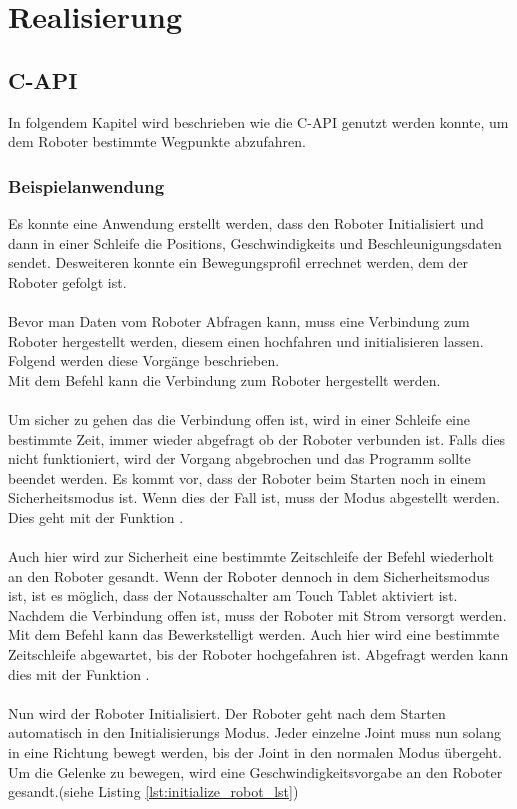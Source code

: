 \chapter{Realisierung}
\label{chap:umsetzung}

\section{C-API}
\label{sec:capi_rel}

In folgendem Kapitel wird beschrieben wie die C-\ac{API} genutzt werden konnte, um dem Roboter bestimmte Wegpunkte abzufahren.

\subsection{Beispielanwendung}
\label{sub:capi-problems_rel}

Es konnte eine Anwendung erstellt werden, dass den Roboter Initialisiert und dann in einer Schleife die Positions, Geschwindigkeits und Beschleunigungsdaten sendet. Desweiteren konnte ein Bewegungsprofil errechnet werden, dem der Roboter gefolgt ist.
\\\\
Bevor man Daten vom Roboter Abfragen kann, muss eine Verbindung zum Roboter hergestellt werden, diesem einen hochfahren und initialisieren lassen. Folgend werden diese Vorgänge beschrieben.\\
Mit dem Befehl  kann die Verbindung zum Roboter hergestellt werden.
\\\\
Um sicher zu gehen das die Verbindung offen ist, wird in einer Schleife eine bestimmte Zeit, immer wieder abgefragt ob der Roboter verbunden ist. Falls dies nicht funktioniert, wird der Vorgang abgebrochen und das Programm sollte beendet werden. Es kommt vor, dass der Roboter beim Starten noch in einem Sicherheitsmodus ist. Wenn dies der Fall ist, muss der Modus abgestellt werden. Dies geht mit der Funktion .
\\\\
Auch hier wird zur Sicherheit eine bestimmte Zeitschleife der Befehl wiederholt an den Roboter gesandt. Wenn der Roboter dennoch in dem Sicherheitsmodus ist, ist es möglich, dass der Notausschalter am Touch Tablet aktiviert ist.
Nachdem die Verbindung offen ist, muss der Roboter mit Strom versorgt werden. Mit dem Befehl  kann das Bewerkstelligt werden. Auch hier wird eine bestimmte Zeitschleife abgewartet, bis der Roboter hochgefahren ist. Abgefragt werden kann dies mit der Funktion .
\\\\
Nun wird der Roboter Initialisiert. Der Roboter geht nach dem Starten automatisch in den Initialisierungs Modus. Jeder einzelne Joint muss nun solang in eine Richtung bewegt werden, bis der Joint in den normalen Modus übergeht. Um die Gelenke zu bewegen, wird eine Geschwindigkeitsvorgabe an den Roboter gesandt.(siehe Listing \ref{lst:initialize_robot_lst})

